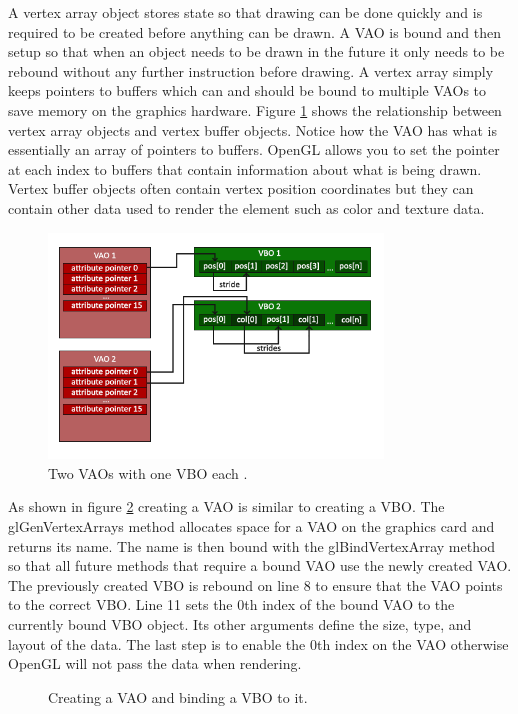 \documentclass{article}
\begin{document}
A vertex array object stores state so that drawing can be done quickly and is required to be created before anything can be drawn. A VAO is bound and then setup so that when an object needs to be drawn in the future it only needs to be rebound without any further instruction before drawing. A vertex array simply keeps pointers to buffers which can and should be bound to multiple VAOs to save memory on the graphics hardware. Figure \ref{fig:vbo-vao-ebo} shows the relationship between vertex array objects and vertex buffer objects. Notice how the VAO has what is essentially an array of pointers to buffers. OpenGL allows you to set the pointer at each index to buffers that contain information about what is being drawn. Vertex buffer objects often contain vertex position coordinates but they can contain other data used to render the element such as color and texture data.

\begin{figure}[h]
    \centering
	\includegraphics[height=6cm]{vao}
	\caption{Two VAOs with one VBO each \cite{devries2019}.}
	\label{fig:vbo-vao-ebo}
\end{figure}

As shown in figure \ref{fig:create-vao} creating a VAO is similar to creating a VBO. The glGenVertexArrays method allocates space for a VAO on the graphics card and returns its name. The name is then bound with the glBindVertexArray method so that all future methods that require a bound VAO use the newly created VAO. The previously created VBO is rebound on line 8 to ensure that the VAO points to the correct VBO. Line 11 sets the 0th index of the bound VAO to the currently bound VBO object. Its other arguments define the size, type, and layout of the data. The last step is to enable the 0th index on the VAO otherwise OpenGL will not pass the data when rendering.

\begin{figure}[h]
	
	\caption{Creating a VAO and binding a VBO to it.}
	\label{fig:create-vao}
\end{figure}
\end{document}
